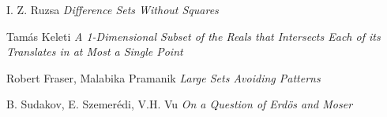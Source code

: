 \documentclass{article}
\theoremstyle{plain}
\theoremstyle{plain}
\begin{document}
\begin{thebibliography}{9}

I. Z. Ruzsa
\textit{Difference Sets Without Squares}

Tam\'{a}s Keleti
\textit{A 1-Dimensional Subset of the Reals that Intersects Each of its Translates in at Most a Single Point}

Robert Fraser, Malabika Pramanik
\textit{Large Sets Avoiding Patterns}

B. Sudakov, E. Szemer\'{e}di, V.H. Vu
\textit{On a Question of Erd\"{o}s and Moser}

\end{thebibliography}


\end{document}
